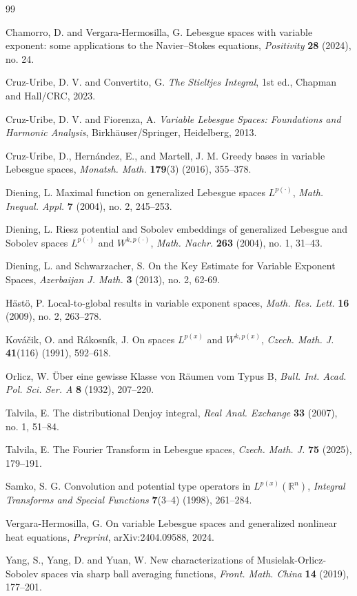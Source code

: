\documentclass[11pt,reqno]{amsart}
\theoremstyle{definition}
\theoremstyle{definition}
\theoremstyle{definition}
\begin{document}
\begin{thebibliography}{99}

 Chamorro, D. and  Vergara-Hermosilla, G. {Lebesgue spaces with variable exponent: some applications to the Navier–Stokes equations},  {\it Positivity} \textbf{28} (2024), no. 24.

Cruz-Uribe, D. V. and Convertito, G.
\textit{The Stieltjes Integral}, 1st ed., Chapman and Hall/CRC, 2023.

Cruz-Uribe, D. V. and Fiorenza, A.  
\textit{Variable Lebesgue Spaces: Foundations and Harmonic Analysis}, Birkhäuser/Springer, Heidelberg, 2013.

Cruz-Uribe, D., Hernández, E., and Martell, J. M.
Greedy bases in variable Lebesgue spaces, 
\textit{Monatsh. Math.} \textbf{179}(3) (2016), 355–378. 



Diening, L. 
Maximal function on generalized Lebesgue spaces $L^{p(\cdot)}$,
\textit{Math. Inequal. Appl.} \textbf{7} (2004), no. 2, 245–253.

Diening, L. 
Riesz potential and Sobolev embeddings of generalized Lebesgue and Sobolev spaces $L^{p(\cdot)}$ and $W^{k,p(\cdot)}$,
\textit{Math. Nachr.} \textbf{263} (2004), no. 1, 31–43.

Diening, L. and Schwarzacher, S. 
On the Key Estimate for Variable Exponent Spaces,
\textit{Azerbaijan J. Math.} \textbf{3} (2013), no. 2, 62-69.


Hästö, P.  
Local-to-global results in variable exponent spaces, 
\textit{Math. Res. Lett.} \textbf{16} (2009), no. 2, 263–278.

Kováčik, O. and Rákosník, J.
On spaces $L^{p(x)}$ and $W^{k,p(x)}$, 
\textit{Czech. Math. J.} \textbf{41}(116) (1991), 592–618.

Orlicz, W.
Über eine gewisse Klasse von Räumen vom Typus B, 
\textit{Bull. Int. Acad. Pol. Sci. Ser. A} \textbf{8} (1932), 207–220.

Talvila, E. 
The distributional Denjoy integral, 
\textit{Real Anal. Exchange} \textbf{33} (2007), no. 1, 51–84.

Talvila, E. 
The Fourier Transform in Lebesgue spaces, 
\textit{Czech. Math. J.} \textbf{75} (2025), 179–191.

Samko, S. G.
Convolution and potential type operators in $L^{p(x)}(\mathbb{R}^n)$, 
\textit{Integral Transforms and Special Functions} \textbf{7}(3--4) (1998), 261--284. 

Vergara-Hermosilla, G. 
On variable Lebesgue spaces and generalized nonlinear heat equations, 
\textit{Preprint}, arXiv:2404.09588, 2024.

Yang, S., Yang, D. and Yuan, W. 
New characterizations of Musielak-Orlicz-Sobolev spaces via sharp ball averaging functions,
\textit{Front. Math. China} \textbf{14} (2019), 177–201.

\end{thebibliography}
\end{document}
